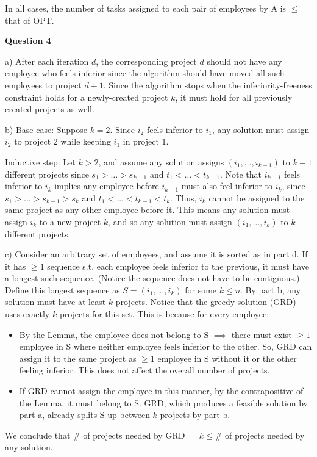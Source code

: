 \documentclass[11pt]{article}
\begin{document}
In all cases, the number of tasks assigned to each pair of employees by A is $\leq$ that of OPT.

\textbf{Question 4}

a) After each iteration $d$, the corresponding project $d$ should not have any employee who feels inferior since the algorithm should have moved all such employees to project $d+1$. Since the algorithm stops when the inferiority-freeness constraint holds for a newly-created project $k$, it must hold for all previously created projects as well.

b) Base case: Suppose $k=2$. Since $i_2$ feels inferior to $i_1$, any solution must assign $i_2$ to project 2 while keeping $i_1$ in project 1.

Inductive step: Let $k>2$, and assume any solution assigns $(i_1,\ldots,i_{k-1})$ to $k-1$ different projects since $s_1>\ldots>s_{k-1}$ and $t_1<\ldots<t_{k-1}$. Note that $i_{k-1}$ feels inferior to $i_k$ implies any employee before $i_{k-1}$ must also feel inferior to $i_k$, since $s_1>\ldots>s_{k-1}>s_k$ and $t_1<\ldots<t_{k-1}<t_k$. Thus, $i_k$ cannot be assigned to the same project as any other employee before it. This means any solution must assign $i_k$ to a new project $k$, and so any solution must assign $(i_1,\ldots,i_k)$ to $k$ different projects.

c) Consider an arbitrary set of employees, and assume it is sorted as in part d. If it has $\geq 1$ sequence s.t. each employee feels inferior to the previous, it must have a longest such sequence. (Notice the sequence does not have to be contiguous.) Define this longest sequence as $S=(i_1,\ldots,i_k)$ for some $k\leq n$. By part b, any solution must have at least $k$ projects. Notice that the greedy solution (GRD) uses exactly $k$ projects for this set. This is because for every employee:

\begin{itemize}
    \item By the Lemma, the employee does not belong to S $\implies$ there must exist $\geq 1$ employee in S where neither employee feels inferior to the other. So, GRD can assign it to the same project as $\geq 1$ employee in S without it or the other feeling inferior. This does not affect the overall number of projects.
    \item If GRD cannot assign the employee in this manner, by the contrapositive of the Lemma, it must belong to S. GRD, which produces a feasible solution by part a, already splits S up between $k$ projects by part b.
\end{itemize} We conclude that $\#$ of projects needed by GRD $=k\leq\#$ of projects needed by any solution.
\end{document}
